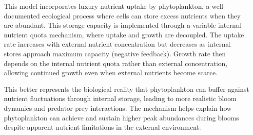 This model incorporates luxury nutrient uptake by phytoplankton, a well-documented ecological process where cells can store excess nutrients when they are abundant. This storage capacity is implemented through a variable internal nutrient quota mechanism, where uptake and growth are decoupled. The uptake rate increases with external nutrient concentration but decreases as internal stores approach maximum capacity (negative feedback). Growth rate then depends on the internal nutrient quota rather than external concentration, allowing continued growth even when external nutrients become scarce.

This better represents the biological reality that phytoplankton can buffer against nutrient fluctuations through internal storage, leading to more realistic bloom dynamics and predator-prey interactions. The mechanism helps explain how phytoplankton can achieve and sustain higher peak abundances during blooms despite apparent nutrient limitations in the external environment.
